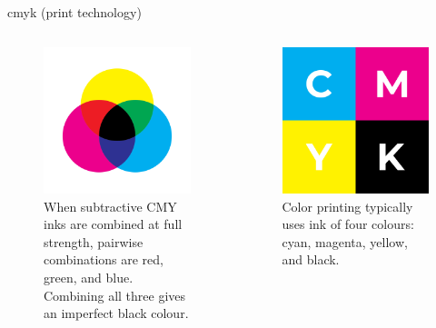 \documentclass[aspectratio=169,xcolor={dvipsnames,svgnames}]{beamer}
\begin{document}
\begin{frame}[label={sec:org8ec1b5f}]{cmyk (print technology)}
\begin{columns}
\begin{column}{.5\columnwidth}
\begin{figure}[htbp]
\centering
\includegraphics[width=0.65\linewidth]{images/CMYK_color_model.svg.png}
\caption{When subtractive CMY inks are combined at full strength, pairwise combinations are red, green, and blue. Combining all three gives an imperfect black colour.}
\end{figure}
\end{column}

\begin{column}{.5\columnwidth}
\begin{figure}[htbp]
\centering
\includegraphics[width=0.65\linewidth]{images/CMYK_Color_Swatches.svg.png}
\caption{Color printing typically uses ink of four colours: cyan, magenta, yellow, and black.}
\end{figure}
\end{column}
\end{columns}
\end{frame}
\end{document}
